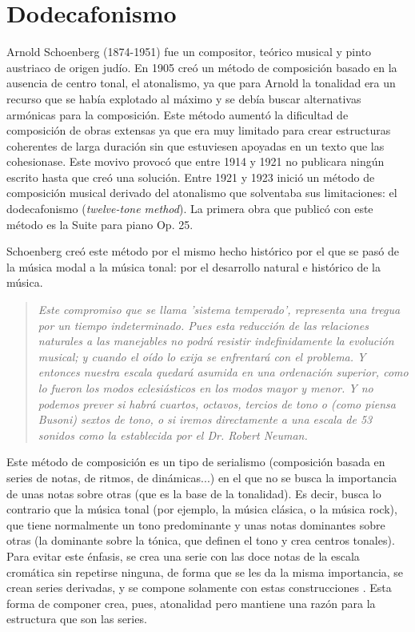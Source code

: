 \documentclass[a4paper,openany,oneside,12pt]{book}
\begin{document}
\section{Dodecafonismo}

Arnold Schoenberg (1874-1951) fue un compositor, teórico musical y pinto austriaco de origen judío. En 1905 creó un método de composición basado en la ausencia de centro tonal, el atonalismo, ya que para Arnold la tonalidad era un recurso que se había explotado al máximo y se debía buscar alternativas armónicas para la composición. Este método aumentó la dificultad de composición de obras extensas ya que era muy limitado para crear estructuras coherentes de larga duración sin que estuviesen apoyadas en un texto que las cohesionase. Este movivo provocó que entre 1914 y 1921 no publicara ningún escrito hasta que creó una solución. Entre 1921 y 1923 inició un método de composición musical derivado del atonalismo que solventaba sus limitaciones: el dodecafonismo (\emph{twelve-tone method})\cite{styleandidea}. La primera obra que publicó con este método es la Suite para piano Op. 25.

Schoenberg creó este método por el mismo hecho histórico por el que se pasó de la música modal a la música tonal: por el desarrollo natural e histórico de la música.

\begin{quote}
\em Este compromiso que se llama 'sistema temperado', representa una tregua por un tiempo indeterminado. Pues esta reducción de las relaciones naturales a las manejables no podrá resistir indefinidamente la evolución musical; y cuando el oído lo exija se enfrentará con el problema. Y entonces nuestra escala quedará asumida en una ordenación superior, como lo fueron los modos eclesiásticos en los modos mayor y menor. Y no podemos prever si habrá cuartos, octavos, tercios de tono o (como piensa Busoni) sextos de tono, o si iremos directamente a una escala de 53 sonidos como la establecida por el Dr. Robert Neuman.\cite{tratadodearmonia}
\end{quote}

Este método de composición es un tipo de serialismo (composición basada en series de notas, de ritmos, de dinámicas...) en el que no se busca la importancia de unas notas sobre otras (que es la base de la tonalidad). Es decir, busca lo contrario que la música tonal (por ejemplo, la música clásica, o la música rock), que tiene normalmente un tono predominante y unas notas dominantes sobre otras (la dominante sobre la tónica, que definen el tono y crea centros tonales). Para evitar este énfasis, se crea una serie con las doce notas de la escala cromática  sin repetirse ninguna, de forma que se les da la misma importancia, se crean series derivadas, y se compone solamente con estas construcciones \cite{wiki:twelvetonetechnique}. Esta forma de componer crea, pues, atonalidad pero mantiene una razón para la estructura que son las series. 
\end{document}
